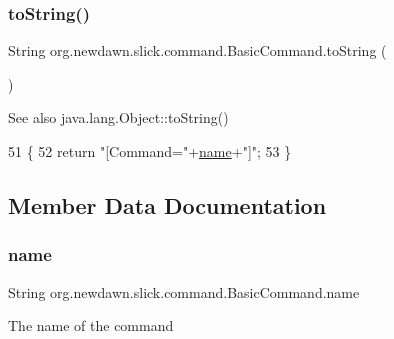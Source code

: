 \subsubsection{\texorpdfstring{to\+String()}{toString()}}
{\footnotesize\ttfamily String org.\+newdawn.\+slick.\+command.\+Basic\+Command.\+to\+String (\begin{DoxyParamCaption}{ }\end{DoxyParamCaption})\hspace{0.3cm}{\ttfamily [inline]}}

\begin{DoxySeeAlso}{See also}
java.\+lang.\+Object\+::to\+String() 
\end{DoxySeeAlso}

\begin{DoxyCode}
51                              \{
52         \textcolor{keywordflow}{return} \textcolor{stringliteral}{"[Command="}+\mbox{\hyperlink{classorg_1_1newdawn_1_1slick_1_1command_1_1_basic_command_a50a5c3e66d1f02b990807d882daddce2}{name}}+\textcolor{stringliteral}{"]"};
53     \}
\end{DoxyCode}


\subsection{Member Data Documentation}
\mbox{\label{classorg_1_1newdawn_1_1slick_1_1command_1_1_basic_command_a50a5c3e66d1f02b990807d882daddce2}} 
\subsubsection{\texorpdfstring{name}{name}}
{\footnotesize\ttfamily String org.\+newdawn.\+slick.\+command.\+Basic\+Command.\+name\hspace{0.3cm}{\ttfamily [private]}}

The name of the command 